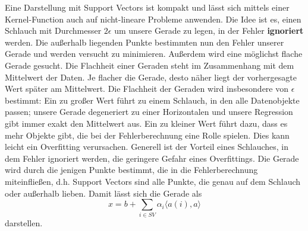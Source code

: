 Eine Darstellung mit Support Vectors ist kompakt und lässt sich mittels
einer Kernel-Function auch auf nicht-lineare Probleme anwenden.
Die Idee ist es, einen Schlauch mit Durchmesser \(2\epsilon\) um
unsere Gerade zu legen, in der Fehler \textbf{ignoriert} werden.
Die außerhalb liegenden Punkte bestimmten nun den Fehler unserer Gerade
und werden versucht zu minimieren. Außerdem wird eine möglichst flache 
Gerade gesucht. Die Flachheit einer Geraden steht im Zusammenhang mit
dem Mittelwert der Daten. Je flacher die Gerade, desto näher liegt der
vorhergesagte Wert später am Mittelwert. Die Flachheit der Geraden 
wird insbesondere von \(\epsilon\) bestimmt: Ein zu großer Wert
führt zu einem Schlauch, in den alle Datenobjekte passen; unsere Gerade
degeneriert zu einer Horizontalen und unsere Regression gibt immer
exakt den Mittelwert aus. Ein zu kleiner Wert führt dazu, dass es mehr
Objekte gibt, die bei der Fehlerberechnung eine Rolle spielen. Dies kann
leicht ein Overfitting verursachen. Generell ist der Vorteil eines
Schlauches, in dem Fehler ignoriert werden, die geringere Gefahr eines
Overfittings. Die Gerade wird durch die jenigen Punkte bestimmt, die
in die Fehlerberechnung miteinfließen, d.h. Support Vectors sind alle
Punkte, die genau auf dem Schlauch oder außerhalb lieben.
Damit lässt sich die Gerade als
\[
x = b + \sum _{i \in SV} \alpha_i \langle a(i),a\rangle
\]
darstellen.